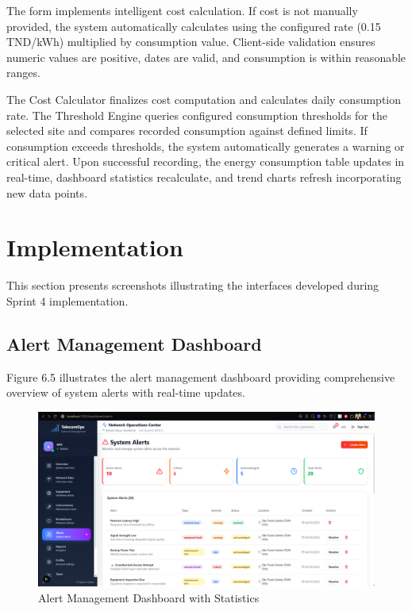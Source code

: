The form implements intelligent cost calculation. If cost is not manually provided, the system automatically calculates using the configured rate (0.15 TND/kWh) multiplied by consumption value. Client-side validation ensures numeric values are positive, dates are valid, and consumption is within reasonable ranges.

The Cost Calculator finalizes cost computation and calculates daily consumption rate. The Threshold Engine queries configured consumption thresholds for the selected site and compares recorded consumption against defined limits. If consumption exceeds thresholds, the system automatically generates a warning or critical alert. Upon successful recording, the energy consumption table updates in real-time, dashboard statistics recalculate, and trend charts refresh incorporating new data points.

\section{Implementation}

This section presents screenshots illustrating the interfaces developed during Sprint 4 implementation.

\subsection{Alert Management Dashboard}

Figure 6.5 illustrates the alert management dashboard providing comprehensive overview of system alerts with real-time updates.

\begin{figure}[H]
    \centering
    \includegraphics[width=0.9\linewidth]{img/chap_06/screenshot_alerts_dashboard.png}
    \caption{Alert Management Dashboard with Statistics}
    \label{fig:alerts_dashboard}
\end{figure}


